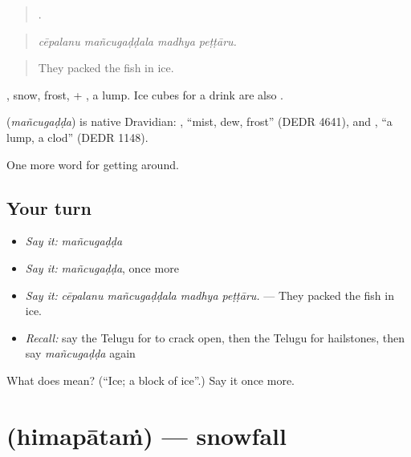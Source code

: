 \begin{quote}
   .
\end{quote}

\begin{quote}
\emph{cēpalanu mañcugaḍḍala madhya peṭṭāru.}
\end{quote}

\begin{quote}
They packed the fish in ice.
\end{quote}

, snow, frost, + , a lump. Ice cubes for a drink are also .

\begin{cousinweb}
\textbf{} (\emph{mañcugaḍḍa}) is native Dravidian: , \textquotedblleft{}mist, dew, frost\textquotedblright{} (DEDR 4641), and , \textquotedblleft{}a lump, a clod\textquotedblright{} (DEDR 1148).
\end{cousinweb}

\begin{grammarlens}[title={What you've built}]
One more word for getting around.
\end{grammarlens}

\subsection*{Your turn}
\begin{itemize}
\raggedright
  \item \emph{Say it:} \emph{mañcugaḍḍa}
  \item \emph{Say it:} \emph{mañcugaḍḍa}, once more
  \item \emph{Say it:} \emph{cēpalanu mañcugaḍḍala madhya peṭṭāru.} — They packed the fish in ice.
  \item \emph{Recall:} say the Telugu for to crack open, then the Telugu for hailstones, then say \emph{mañcugaḍḍa} again
\end{itemize}

\begin{tcolorbox}[breakable,colback=teal!4,colframe=teal!35!black,title={Before you move on}]
What does  mean? (\textquotedblleft{}Ice; a block of ice\textquotedblright{}.) Say it once more.
\end{tcolorbox}
\section[\texorpdfstring{\te{హిమపాతం} (himapātaṁ)}{హిమపాతం (himapātaṁ)}]{ (himapātaṁ) — snowfall}

